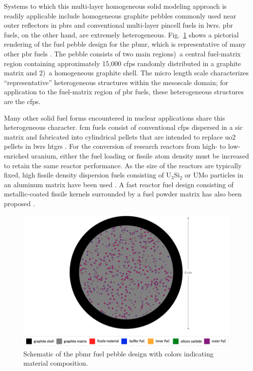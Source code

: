 Systems to which this multi-layer homogeneous solid modeling approach is readily applicable include homogeneous graphite pebbles commonly used near outer reflectors in \glspl{pbr} and conventional multi-layer pincell fuels in \glspl{lwr}. \gls{pbr} fuels, on the other hand, are extremely heterogeneous. Fig.\ \ref{fig:pbmr_pebble} shows a pictorial rendering of the fuel pebble design for the \gls{pbmr}, which is representative of many other \gls{pbr} fuels \cite{tecdoc1694}. The pebble consists of two main regions)~a central fuel-matrix region containing approximately 15,000 \glspl{cfp} randomly distributed in a graphite matrix and 2)~a homogeneous graphite shell. The micro length scale characterizes ``representative'' heterogeneous structures within the mesoscale domain; for application to the fuel-matrix region of \gls{pbr} fuels, these heterogeneous structures are the \glspl{cfp}.

Many other solid fuel forms encountered in nuclear applications share this heterogeneous character. \gls{fcm} fuels consist of conventional \glspl{cfp} dispersed in a \gls{sic} matrix and fabricated into cylindrical pellets that are intended to replace \gls{uo2} pellets in \glspl{lwr} \glspl{htgr} \cite{lu,snead_fcm}. For the conversion of research reactors from high- to low-enriched uranium, either the fuel loading or fissile atom density must be increased to retain the same reactor performance. As the size of the reactors are typically fixed, high fissile density dispersion fuels consisting of U$_3$Si$_2$ or UMo particles in an aluminum matrix have been used \cite{mistarihi,jeong2015}. A fast reactor fuel design consisting of metallic-coated fissile kernels surrounded by a fuel powder matrix has also been proposed \cite{abdalla}.

\begin{figure}[!h]
\centering
  \includegraphics[width=0.85\linewidth]{figs/pbmr_pebble.png}
\caption{Schematic of the \gls{pbmr} fuel pebble design with colors indicating material composition.}
\label{fig:pbmr_pebble}
\end{figure}

